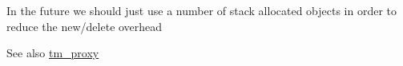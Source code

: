 
\begin{DoxyRefList}
\item[\label{todo__todo000001}%
\hypertarget{todo__todo000001}{}%
Member \hyperlink{classuva_1_1smt_1_1bpbd_1_1server_1_1tm_1_1proxy_1_1tm__proxy__local_af91a15abfca464b58f7e752ebc258364}{uva\+:\+:smt\+:\+:bpbd\+:\+:server\+:\+:tm\+:\+:proxy\+:\+:tm\+\_\+proxy\+\_\+local\+:\+:dispose\+\_\+query\+\_\+proxy} (\hyperlink{classuva_1_1smt_1_1bpbd_1_1server_1_1tm_1_1proxy_1_1tm__query__proxy}{tm\+\_\+query\+\_\+proxy} \&query)]In the future we should just use a number of stack allocated objects in order to reduce the new/delete overhead \begin{DoxySeeAlso}{See also}
\hyperlink{classuva_1_1smt_1_1bpbd_1_1server_1_1tm_1_1proxy_1_1tm__proxy}{tm\+\_\+proxy} 
\end{DoxySeeAlso}

\end{DoxyRefList}